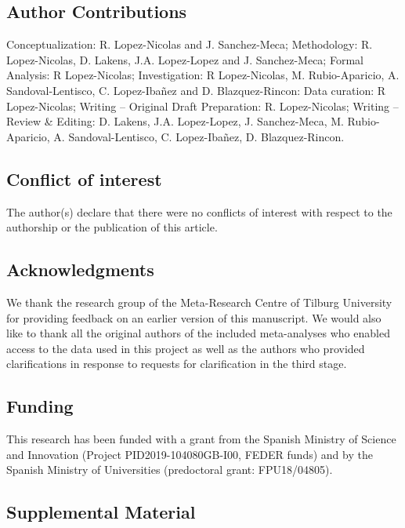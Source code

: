 \documentclass[
  ,jou, a4paper,floatsintext]{apa6}
\begin{document}
\hypertarget{author-contributions}{%
\subsection{Author Contributions}\label{author-contributions}}

Conceptualization: R. Lopez-Nicolas and J. Sanchez-Meca; Methodology: R. Lopez-Nicolas, D. Lakens, J.A. Lopez-Lopez and J. Sanchez-Meca; Formal Analysis: R Lopez-Nicolas; Investigation: R Lopez-Nicolas, M. Rubio-Aparicio, A. Sandoval-Lentisco, C. Lopez-Ibañez and D. Blazquez-Rincon: Data curation: R Lopez-Nicolas; Writing -- Original Draft Preparation: R. Lopez-Nicolas; Writing -- Review \& Editing: D. Lakens, J.A. Lopez-Lopez, J. Sanchez-Meca, M. Rubio-Aparicio, A. Sandoval-Lentisco, C. Lopez-Ibañez, D. Blazquez-Rincon.

\hypertarget{conflict-of-interest}{%
\subsection{Conflict of interest}\label{conflict-of-interest}}

The author(s) declare that there were no conflicts of interest with respect to the authorship or the publication of this article.

\hypertarget{acknowledgments}{%
\subsection{Acknowledgments}\label{acknowledgments}}

We thank the research group of the Meta-Research Centre of Tilburg University for providing feedback on an earlier version of this manuscript. We would also like to thank all the original authors of the included meta-analyses who enabled access to the data used in this project as well as the authors who provided clarifications in response to requests for clarification in the third stage.

\hypertarget{funding}{%
\subsection{Funding}\label{funding}}

This research has been funded with a grant from the Spanish Ministry of Science and Innovation (Project PID2019-104080GB-I00, FEDER funds) and by the Spanish Ministry of Universities (predoctoral grant: FPU18/04805).

\hypertarget{supplemental-material}{%
\subsection{Supplemental Material}\label{supplemental-material}}
\end{document}
